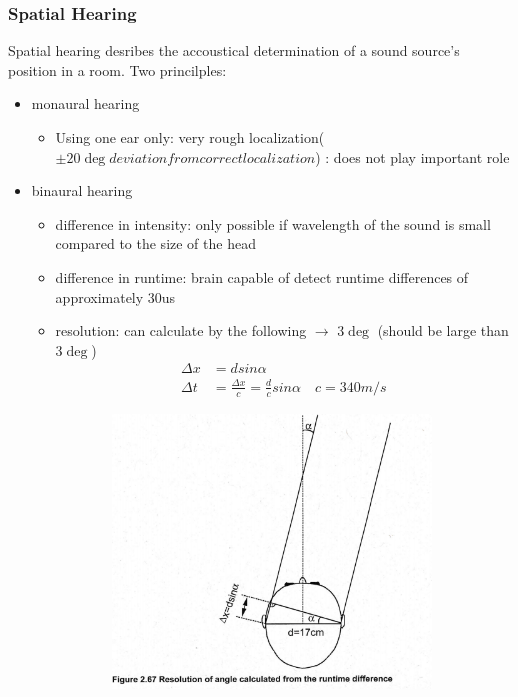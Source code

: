 \documentclass{standalone}
\begin{document}
\subsubsection{Spatial Hearing}
Spatial hearing desribes the accoustical determination of a sound source's position in a room. Two princilples:
\begin{itemize}
	\item monaural hearing
	\begin{itemize}
		\item Using one ear only: very rough localization($\pm 20 \deg deviation from correct localization$) : does not play important role
	\end{itemize}
	\item binaural hearing
	\begin{itemize}
		\item difference in intensity: only possible if wavelength of the sound is small compared to the size of the head
		\item difference in runtime: brain capable of detect runtime differences of approximately 30us
		\item resolution: can calculate by the following $\rightarrow$ $3\deg$ (should be large than $3\deg$)
			\begin{align}
				\Delta x &= d sin \alpha \\
				\Delta t &= \frac{\Delta x}{c} = \frac{d}{c} sin \alpha \quad c = 340m/s
			\end{align}
	\end{itemize}
	\begin{figure}[H]
			\centering
		\begin{subfigure}[b]{0.45\textwidth}
			\includegraphics[width = 0.7\linewidth]{Figures/2_67.png}
		\end{subfigure}

\end{figure}
\end{itemize}
\end{document}
